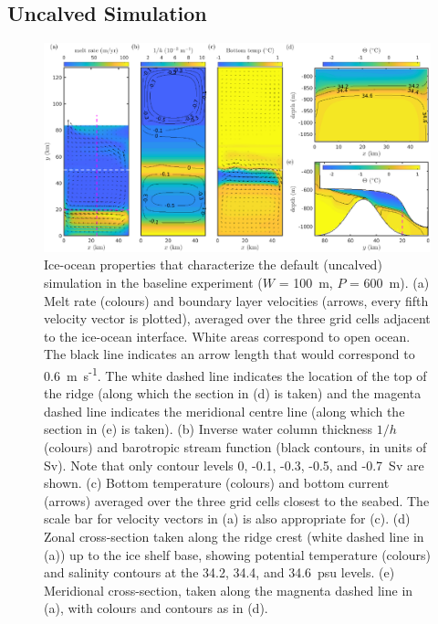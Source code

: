 \documentclass[draft]{agujournal2019}
\begin{document}
\subsection{Uncalved Simulation}\label{S:Baseline:Default}
\begin{figure}
    \centering
    \includegraphics[width = \textwidth]{../make_figures/plots/figure3.eps}
    \caption{Ice-ocean properties that characterize the default (uncalved) simulation in the baseline experiment ($W$ = 100~m, $P$ = 600~m). (a) Melt rate (colours) and boundary layer velocities (arrows, every fifth velocity vector is plotted), averaged over the three grid cells adjacent to the ice-ocean interface. White areas correspond to open ocean. The black line indicates an arrow length that would correspond to 0.6~m~s\textsuperscript{-1}. The white dashed line indicates the location of the top of the ridge (along which the section in (d) is taken) and the magenta dashed line indicates the meridional centre line (along which the section in (e) is taken). (b) Inverse water column thickness $1/h$ (colours) and barotropic stream function (black contours, in units of Sv). Note that only contour levels 0, -0.1, -0.3, -0.5, and -0.7~Sv are shown. (c) Bottom temperature (colours) and bottom current (arrows) averaged over the three grid cells closest to the seabed. The scale bar for velocity vectors in (a) is also appropriate for (c). (d) Zonal cross-section taken along the ridge crest (white dashed line in (a)) up to the ice shelf base, showing potential temperature (colours) and salinity contours at the 34.2, 34.4, and 34.6~psu levels. (e) Meridional cross-section, taken along the magnenta dashed line in (a), with colours and contours as in (d).}
    \label{fig:figure3}
\end{figure}
\end{document}
